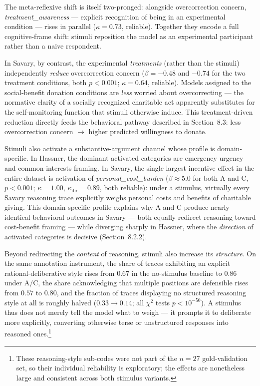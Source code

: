 \documentclass[14pt,a4paper]{extarticle}
\begin{document}
The meta-reflexive shift is itself two-pronged: alongside overcorrection concern, \emph{treatment\_awareness} --- explicit recognition of being in an experimental condition --- rises in parallel ($\kappa = 0.73$, reliable). Together they encode a full cognitive-frame shift: stimuli reposition the model as an experimental participant rather than a naive respondent.

In Savary, by contrast, the experimental \emph{treatments} (rather than the stimuli) independently \emph{reduce} overcorrection concern ($\beta = -0.48$ and $-0.74$ for the two treatment conditions, both $p < 0.001$; $\kappa = 0.64$, reliable). Models assigned to the social-benefit donation conditions are \emph{less} worried about overcorrecting --- the normative clarity of a socially recognized charitable act apparently substitutes for the self-monitoring function that stimuli otherwise induce. This treatment-driven reduction directly feeds the behavioral pathway described in Section~8.3: less overcorrection concern $\to$ higher predicted willingness to donate.

Stimuli also activate a substantive-argument channel whose profile is domain-specific. In Hassner, the dominant activated categories are emergency urgency and common-interests framing. In Savary, the single largest incentive effect in the entire dataset is activation of \emph{personal\_cost\_burden} ($\beta \approx 5.0$ for both A and C, $p < 0.001$; $\kappa = 1.00$, $\kappa_{\mathrm{dir}} = 0.89$, both reliable): under a stimulus, virtually every Savary reasoning trace explicitly weighs personal costs and benefits of charitable giving. This domain-specific profile explains why A and C produce nearly identical behavioral outcomes in Savary --- both equally redirect reasoning toward cost-benefit framing --- while diverging sharply in Hassner, where the \emph{direction} of activated categories is decisive (Section~8.2.2).

Beyond redirecting the \emph{content} of reasoning, stimuli also increase its \emph{structure}. On the same annotation instrument, the share of traces exhibiting an explicit rational-deliberative style rises from $0.67$ in the no-stimulus baseline to $0.86$ under A/C, the share acknowledging that multiple positions are defensible rises from $0.57$ to $0.80$, and the fraction of traces displaying no structured reasoning style at all is roughly halved ($0.33 \to 0.14$; all $\chi^2$ tests $p < 10^{-50}$). A stimulus thus does not merely tell the model what to weigh --- it prompts it to deliberate more explicitly, converting otherwise terse or unstructured responses into reasoned ones.\footnote{These reasoning-style sub-codes were not part of the $n = 27$ gold-validation set, so their individual reliability is exploratory; the effects are nonetheless large and consistent across both stimulus variants.}
\end{document}
